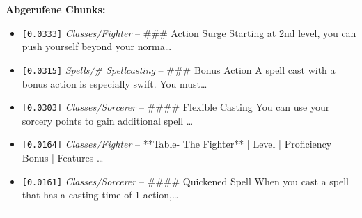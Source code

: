 \noindent\textbf{Abgerufene Chunks:}
\begin{itemize}[noitemsep, topsep=2pt]
  \item[\textbf{\#1}] \texttt{[0.0333]} \textit{Classes/Fighter} -- \#\#\# Action Surge  Starting at 2nd level, you can push yourself beyond your norma\ldots
  \item[\textbf{\#2}] \texttt{[0.0315]} \textit{Spells/# Spellcasting} -- \#\#\# Bonus Action  A spell cast with a bonus action is especially swift. You must\ldots
  \item[\textbf{\#3}] \texttt{[0.0303]} \textit{Classes/Sorcerer} -- \#\#\#\# Flexible Casting  You can use your sorcery points to gain additional spell \ldots
  \item[\textbf{\#4}] \texttt{[0.0164]} \textit{Classes/Fighter} -- **Table- The Fighter**  | Level | Proficiency Bonus | Features                  \ldots
  \item[\textbf{\#5}] \texttt{[0.0161]} \textit{Classes/Sorcerer} -- \#\#\#\# Quickened Spell  When you cast a spell that has a casting time of 1 action,\ldots
\end{itemize}
\vspace{4pt}
\hrule
\vspace{6pt}
